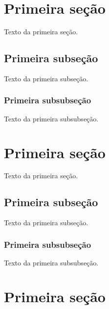\documentclass[a4paper,12pt,oneside,onecolumn,final,fleqn]{repUERJ}
\begin{document}
\section{Primeira seção}

Texto da primeira seção.

\subsection{Primeira subseção}

Texto da primeira subseção.

\subsubsection{Primeira subsubseção}

Texto da primeira subsubseção.


\annex %


\section{Primeira seção}

Texto da primeira seção.

\subsection{Primeira subseção}

Texto da primeira subseção.

\subsubsection{Primeira subsubseção}

Texto da primeira subsubseção.


\section{Primeira seção}
\end{document}
